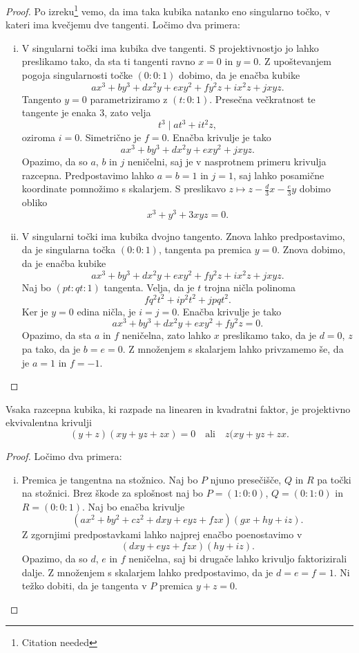\begin{proof}
Po izreku\footnote{Citation needed} vemo, da ima taka kubika
natanko eno singularno točko, v kateri ima kvečjemu dve tangenti.
Ločimo dva primera:

\begin{enumerate}[i)]
\item V singularni točki ima kubika dve tangenti. S projektivnostjo
jo lahko preslikamo tako, da sta ti tangenti ravno $x=0$ in $y=0$.
Z upoštevanjem pogoja singularnosti točke $(0 : 0 : 1)$ dobimo, da
je enačba kubike
\[
ax^3 + by^3 + dx^2y + exy^2 + fy^2z + ix^2z + jxyz.
\]
Tangento $y = 0$ parametriziramo z $(t : 0 : 1)$. Presečna
večkratnost te tangente je enaka $3$, zato velja
\[
t^3 \mid at^3 + it^2z,
\]
oziroma $i = 0$. Simetrično je $f = 0$. Enačba krivulje je tako
\[
ax^3 + by^3 + dx^2y + exy^2 + jxyz.
\]
Opazimo, da so $a$, $b$ in $j$ neničelni, saj je v nasprotnem
primeru krivulja razcepna. Predpostavimo lahko $a = b = 1$ in
$j = 1$, saj lahko posamične koordinate pomnožimo s skalarjem.
S preslikavo $z \mapsto z - \frac{d}{3} x - \frac{e}{3} y$ dobimo
obliko
\[
x^3 + y^3 + 3xyz = 0.
\]
\item V singularni točki ima kubika dvojno tangento. Znova lahko
predpostavimo, da je singularna točka $(0 : 0 : 1)$, tangenta pa
premica $y = 0$. Znova dobimo, da je enačba kubike
\[
ax^3 + by^3 + dx^2y + exy^2 + fy^2z + ix^2z + jxyz.
\]
Naj bo $(pt : qt : 1)$ tangenta. Velja, da je $t$ trojna ničla
polinoma
\[
fq^2t^2 + ip^2t^2 + jpqt^2.
\]
Ker je $y = 0$ edina ničla, je $i = j = 0$. Enačba krivulje je tako
\[
ax^3 + by^3 + dx^2y + exy^2 + fy^2z = 0.
\]
Opazimo, da sta $a$ in $f$ neničelna, zato lahko $x$ preslikamo
tako, da je $d = 0$, $z$ pa tako, da je $b = e = 0$. Z množenjem s
skalarjem lahko privzamemo še, da je $a = 1$ in $f = -1$. \qedhere
\end{enumerate}
\end{proof}

\begin{izrek}
Vsaka razcepna kubika, ki razpade na linearen in kvadratni faktor,
je projektivno ekvivalentna krivulji
\[
(y+z)(xy+yz+zx) = 0
\quad \text{ali} \quad
z(xy+yz+zx.
\]
\end{izrek}

\begin{proof}
Ločimo dva primera:

\begin{enumerate}[i)]
\item Premica je tangentna na stožnico. Naj bo $P$ njuno
presečišče, $Q$ in $R$ pa točki na stožnici. Brez škode za
splošnost naj bo $P = (1 : 0 : 0)$, $Q = (0 : 1 : 0)$ in
$R = (0 : 0 : 1)$. Naj bo enačba krivulje
\[
(ax^2 + by^2 + cz^2 + dxy + eyz + fzx)(gx + hy + iz).
\]
Z zgornjimi predpostavkami lahko najprej enačbo poenostavimo v
\[
(dxy + eyz + fzx)(hy + iz).
\]
Opazimo, da so $d$, $e$ in $f$ neničelna, saj bi drugače lahko
krivuljo faktorizirali dalje. Z množenjem s skalarjem lahko
predpostavimo, da je $d = e = f = 1$. Ni težko dobiti, da je
tangenta v $P$ premica $y + z = 0$.
\end{enumerate}
\end{proof}

